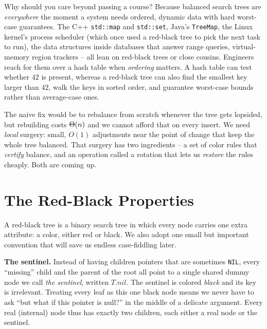 \begin{aestheticbox}
Why should you care beyond passing a course? Because balanced search trees are
\emph{everywhere} the moment a system needs ordered, dynamic data with hard
worst-case guarantees. The C++ \texttt{std::map} and \texttt{std::set}, Java's
\texttt{TreeMap}, the Linux kernel's process scheduler (which once used a
red-black tree to pick the next task to run), the data structures inside
databases that answer range queries, virtual-memory region trackers -- all lean
on red-black trees or close cousins. Engineers reach for them over a hash table
when \emph{ordering} matters. A hash table can test whether $42$ is present,
whereas a red-black tree can also find the smallest key larger than $42$, walk
the keys in sorted order, and guarantee worst-case bounds rather than
average-case ones.
\end{aestheticbox}

The naive fix would be to rebalance from scratch whenever the tree gets lopsided,
but rebuilding costs $\Theta(n)$ and we cannot afford that on every insert. We need
\emph{local} surgery: small, $O(1)$ adjustments near the point of change that
keep the whole tree balanced. That surgery has two ingredients -- a set of color
rules that \emph{certify} balance, and an operation called a rotation that lets
us \emph{restore} the rules cheaply. Both are coming up.

\section{The Red-Black Properties}

A red-black tree is a binary search tree in which every node carries one extra
attribute: a color, either red or black. We also adopt one small but important
convention that will save us endless case-fiddling later.

\begin{focusbox}
\textbf{The sentinel.} Instead of having children pointers that are sometimes
\texttt{NIL}, every ``missing'' child and the parent of the root all point to a
single shared dummy node we call \emph{the sentinel}, written $T.nil$. The
sentinel is colored \emph{black} and its key is irrelevant. Treating every leaf
as this one black node means we never have to ask ``but what if this pointer is
null?'' in the middle of a delicate argument. Every real (internal) node thus has
exactly two children, each either a real node or the sentinel.
\end{focusbox}

